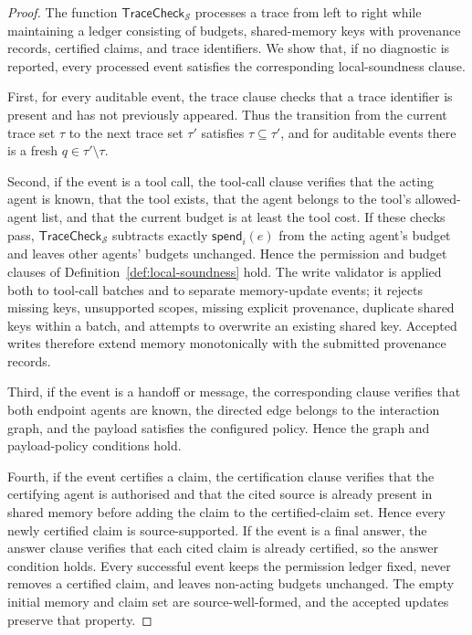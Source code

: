 \documentclass[a4paper,fleqn]{cas-sc}
\newcommand{\TraceCheck}{\mathsf{TraceCheck}}
\begin{document}
\begin{proof}
The function \(\TraceCheck_{\mathcal{S}}\) processes a trace from left to right while maintaining a ledger consisting of budgets, shared-memory keys with provenance records, certified claims, and trace identifiers. We show that, if no diagnostic is reported, every processed event satisfies the corresponding local-soundness clause.

First, for every auditable event, the trace clause checks that a trace identifier is present and has not previously appeared. Thus the transition from the current trace set \(\tau\) to the next trace set \(\tau'\) satisfies \(\tau\subseteq\tau'\), and for auditable events there is a fresh \(q\in\tau'\setminus\tau\).

Second, if the event is a tool call, the tool-call clause verifies that the acting agent is known, that the tool exists, that the agent belongs to the tool's allowed-agent list, and that the current budget is at least the tool cost. If these checks pass, \(\TraceCheck_{\mathcal{S}}\) subtracts exactly \(\mathsf{spend}_i(e)\) from the acting agent's budget and leaves other agents' budgets unchanged. Hence the permission and budget clauses of Definition~\ref{def:local-soundness} hold. The write validator is applied both to tool-call batches and to separate memory-update events; it rejects missing keys, unsupported scopes, missing explicit provenance, duplicate shared keys within a batch, and attempts to overwrite an existing shared key. Accepted writes therefore extend memory monotonically with the submitted provenance records.

Third, if the event is a handoff or message, the corresponding clause verifies that both endpoint agents are known, the directed edge belongs to the interaction graph, and the payload satisfies the configured policy. Hence the graph and payload-policy conditions hold.

Fourth, if the event certifies a claim, the certification clause verifies that the certifying agent is authorised and that the cited source is already present in shared memory before adding the claim to the certified-claim set. Hence every newly certified claim is source-supported. If the event is a final answer, the answer clause verifies that each cited claim is already certified, so the answer condition holds. Every successful event keeps the permission ledger fixed, never removes a certified claim, and leaves non-acting budgets unchanged. The empty initial memory and claim set are source-well-formed, and the accepted updates preserve that property.


\end{proof}
\end{document}
